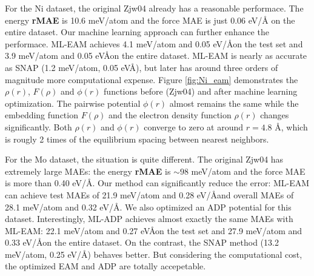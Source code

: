 \documentclass[prb,reprint]{revtex4-2}
\begin{document}
For the Ni dataset, the original Zjw04 already has a reasonable performace. 
The energy \textbf{rMAE} is 10.6 meV/atom and the force MAE is just 0.06 eV/\AA 
on the entire dataset. Our machine learning approach can further enhance the 
performace. ML-EAM achieves 4.1 meV/atom and 0.05 eV/\AA on the test set and 
3.9 meV/atom and 0.05 eV\AA on the entire dataset. ML-EAM is nearly as accurate 
as SNAP (1.2 meV/atom, 0.05 eV\AA), but later has around three orders of 
magnitude more computational expense. Figure \ref{fig:Ni_eam} demonstrates the 
$\rho(r)$, $F(\rho)$ and $\phi(r)$ functions before (Zjw04) and after machine 
learning optimization. The pairwise potential $\phi(r)$ almost remains the same 
while the embedding function $F(\rho)$ and the electron density function 
$\rho(r)$ changes significantly. Both $\rho(r)$ and $\phi(r)$ converge to zero 
at around $r=4.8$ \AA, which is rougly 2 times of the equilibrium spacing 
between nearest neighbors.

For the Mo dataset, the situation is quite different. The original Zjw04 has 
extremely large MAEs: the energy \textbf{rMAE} is $\sim 98$ meV/atom and the 
force MAE is more than 0.40 eV/\AA. Our method can significantly reduce the 
error: ML-EAM can achieve test MAEs of 21.9 meV/atom and 0.28 eV/\AA and overall
MAEs of 28.1 meV/atom and 0.32 eV/\AA. We also optimized an ADP potential for 
this dataset. Interestingly, ML-ADP achieves almost exactly the same MAEs with 
ML-EAM: 22.1 meV/atom and 0.27 eV\AA on the test set and 27.9 meV/atom and 0.33 
eV/\AA on the entire dataset. On the contrast, the SNAP method (13.2 meV/atom, 
0.25 eV/\AA) behaves better. But considering the computational cost, the 
optimized EAM and ADP are totally accepetable.
\end{document}
